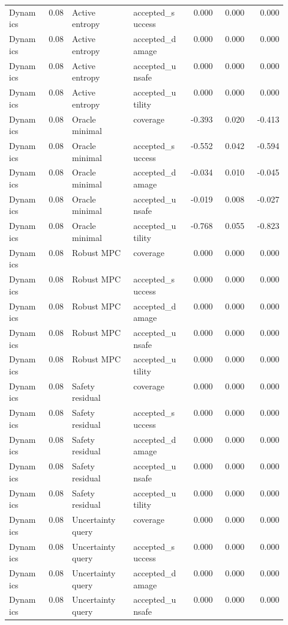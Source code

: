 \documentclass{article}
\begin{document}
\begin{center}
\begin{longtable}{p{0.13\linewidth}rp{0.22\linewidth}p{0.19\linewidth}rrr}
Dynamics & 0.08 & Active entropy & accepted\_success & 0.000 & 0.000 & 0.000\\
Dynamics & 0.08 & Active entropy & accepted\_damage & 0.000 & 0.000 & 0.000\\
Dynamics & 0.08 & Active entropy & accepted\_unsafe & 0.000 & 0.000 & 0.000\\
Dynamics & 0.08 & Active entropy & accepted\_utility & 0.000 & 0.000 & 0.000\\
Dynamics & 0.08 & Oracle minimal & coverage & -0.393 & 0.020 & -0.413\\
Dynamics & 0.08 & Oracle minimal & accepted\_success & -0.552 & 0.042 & -0.594\\
Dynamics & 0.08 & Oracle minimal & accepted\_damage & -0.034 & 0.010 & -0.045\\
Dynamics & 0.08 & Oracle minimal & accepted\_unsafe & -0.019 & 0.008 & -0.027\\
Dynamics & 0.08 & Oracle minimal & accepted\_utility & -0.768 & 0.055 & -0.823\\
Dynamics & 0.08 & Robust MPC & coverage & 0.000 & 0.000 & 0.000\\
Dynamics & 0.08 & Robust MPC & accepted\_success & 0.000 & 0.000 & 0.000\\
Dynamics & 0.08 & Robust MPC & accepted\_damage & 0.000 & 0.000 & 0.000\\
Dynamics & 0.08 & Robust MPC & accepted\_unsafe & 0.000 & 0.000 & 0.000\\
Dynamics & 0.08 & Robust MPC & accepted\_utility & 0.000 & 0.000 & 0.000\\
Dynamics & 0.08 & Safety residual & coverage & 0.000 & 0.000 & 0.000\\
Dynamics & 0.08 & Safety residual & accepted\_success & 0.000 & 0.000 & 0.000\\
Dynamics & 0.08 & Safety residual & accepted\_damage & 0.000 & 0.000 & 0.000\\
Dynamics & 0.08 & Safety residual & accepted\_unsafe & 0.000 & 0.000 & 0.000\\
Dynamics & 0.08 & Safety residual & accepted\_utility & 0.000 & 0.000 & 0.000\\
Dynamics & 0.08 & Uncertainty query & coverage & 0.000 & 0.000 & 0.000\\
Dynamics & 0.08 & Uncertainty query & accepted\_success & 0.000 & 0.000 & 0.000\\
Dynamics & 0.08 & Uncertainty query & accepted\_damage & 0.000 & 0.000 & 0.000\\
Dynamics & 0.08 & Uncertainty query & accepted\_unsafe & 0.000 & 0.000 & 0.000\\

\end{longtable}
\end{center}
\end{document}
